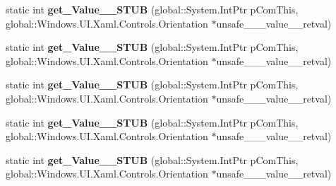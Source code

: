 \begin{DoxyCompactItemize}
\item 
\mbox{\label{struct_system_1_1_nullable___a___windows___u_i___xaml___controls___orientation___v_______impl_1_1_vtbl_acc25842b16fda2295a45113e3e1859fb}} 
static int {\bfseries get\+\_\+\+Value\+\_\+\+\_\+\+S\+T\+UB} (global\+::\+System.\+Int\+Ptr p\+Com\+This, global\+::\+Windows.\+U\+I.\+Xaml.\+Controls.\+Orientation $\ast$unsafe\+\_\+\+\_\+\+\_\+value\+\_\+\+\_\+retval)
\item 
\mbox{\label{struct_system_1_1_nullable___a___windows___u_i___xaml___controls___orientation___v_______impl_1_1_vtbl_acc25842b16fda2295a45113e3e1859fb}} 
static int {\bfseries get\+\_\+\+Value\+\_\+\+\_\+\+S\+T\+UB} (global\+::\+System.\+Int\+Ptr p\+Com\+This, global\+::\+Windows.\+U\+I.\+Xaml.\+Controls.\+Orientation $\ast$unsafe\+\_\+\+\_\+\+\_\+value\+\_\+\+\_\+retval)
\item 
\mbox{\label{struct_system_1_1_nullable___a___windows___u_i___xaml___controls___orientation___v_______impl_1_1_vtbl_acc25842b16fda2295a45113e3e1859fb}} 
static int {\bfseries get\+\_\+\+Value\+\_\+\+\_\+\+S\+T\+UB} (global\+::\+System.\+Int\+Ptr p\+Com\+This, global\+::\+Windows.\+U\+I.\+Xaml.\+Controls.\+Orientation $\ast$unsafe\+\_\+\+\_\+\+\_\+value\+\_\+\+\_\+retval)
\item 
\mbox{\label{struct_system_1_1_nullable___a___windows___u_i___xaml___controls___orientation___v_______impl_1_1_vtbl_acc25842b16fda2295a45113e3e1859fb}} 
static int {\bfseries get\+\_\+\+Value\+\_\+\+\_\+\+S\+T\+UB} (global\+::\+System.\+Int\+Ptr p\+Com\+This, global\+::\+Windows.\+U\+I.\+Xaml.\+Controls.\+Orientation $\ast$unsafe\+\_\+\+\_\+\+\_\+value\+\_\+\+\_\+retval)
\item 
\mbox{\label{struct_system_1_1_nullable___a___windows___u_i___xaml___controls___orientation___v_______impl_1_1_vtbl_acc25842b16fda2295a45113e3e1859fb}} 
static int {\bfseries get\+\_\+\+Value\+\_\+\+\_\+\+S\+T\+UB} (global\+::\+System.\+Int\+Ptr p\+Com\+This, global\+::\+Windows.\+U\+I.\+Xaml.\+Controls.\+Orientation $\ast$unsafe\+\_\+\+\_\+\+\_\+value\+\_\+\+\_\+retval)
\end{DoxyCompactItemize}
